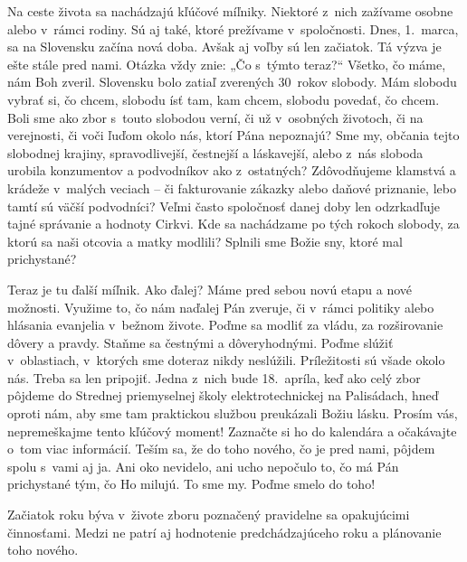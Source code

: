 


Na ceste života sa nachádzajú kľúčové míľniky. Niektoré z~nich zažívame osobne alebo v~rámci rodiny. Sú aj také, ktoré prežívame v~spoločnosti. Dnes, 1.~marca, sa na Slovensku začína nová doba. Avšak aj voľby sú len začiatok. Tá výzva je ešte stále pred nami. Otázka vždy znie: „Čo s~týmto teraz?“ Všetko, čo máme, nám Boh zveril. Slovensku bolo zatiaľ zverených 30~rokov slobody. Mám slobodu vybrať si, čo chcem, slobodu ísť tam, kam chcem, slobodu povedať, čo chcem. Boli sme ako zbor s~touto slobodou verní, či už v~osobných životoch, či na verejnosti, či voči ľuďom okolo nás, ktorí Pána nepoznajú? Sme my, občania tejto slobodnej krajiny, spravodlivejší, čestnejší a láskavejší, alebo z~nás sloboda urobila konzumentov a podvodníkov ako z~ostatných? Zdôvodňujeme klamstvá a krádeže v~malých veciach – či fakturovanie zákazky alebo daňové priznanie, lebo tamtí sú väčší podvodníci? Veľmi často spoločnosť danej doby len odzrkadľuje tajné správanie a hodnoty Cirkvi. Kde sa nachádzame po tých rokoch slobody, za ktorú sa naši otcovia a matky modlili? Splnili sme Božie sny, ktoré mal prichystané?

Teraz je tu ďalší míľnik. Ako ďalej? Máme pred sebou novú etapu a nové možnosti. Využime to, čo nám naďalej Pán zveruje, či v~rámci politiky alebo hlásania evanjelia v~bežnom živote. Poďme sa modliť za vládu, za rozširovanie dôvery a pravdy. Staňme sa čestnými a dôveryhodnými. Poďme slúžiť v~oblastiach, v~ktorých sme doteraz nikdy neslúžili. Príležitosti sú všade okolo nás. Treba sa len pripojiť. Jedna z~nich bude 18.~apríla, keď ako celý zbor pôjdeme do Strednej priemyselnej školy elektrotechnickej na Palisádach, hneď oproti nám, aby sme tam praktickou službou preukázali Božiu lásku. Prosím vás, nepremeškajme tento kľúčový moment! Zaznačte si ho do kalendára a očakávajte o~tom viac informácií. Teším sa, že do toho nového, čo je pred nami, pôjdem spolu s~vami aj ja. Ani oko nevidelo, ani ucho nepočulo to, čo má Pán prichystané tým, čo Ho milujú. To sme my. Poďme smelo do toho!



Začiatok roku býva v~živote zboru poznačený pravidelne sa opakujúcimi činnosťami. Medzi ne patrí aj hodnotenie predchádzajúceho roku a plánovanie toho nového.


